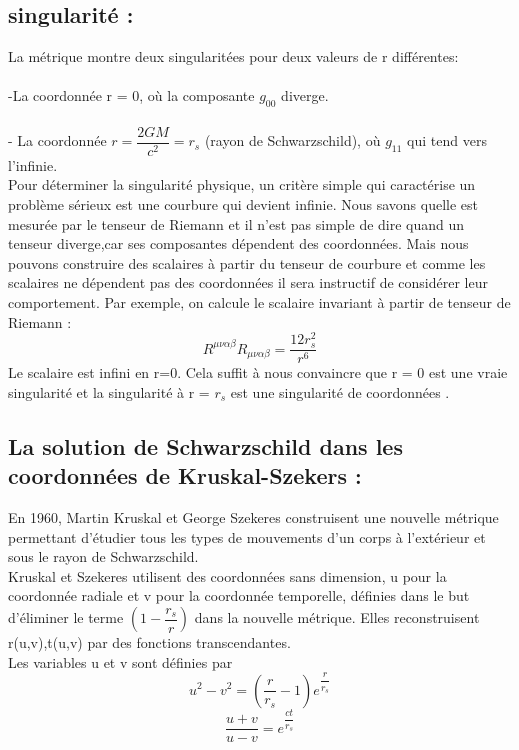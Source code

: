 \documentclass[12pt,  a4paper, openright]{report} %
\begin{document}
\subsection*{ singularité : }
La métrique montre deux singularitées pour deux valeurs de r différentes:\\
\\
-La coordonnée r = 0, où la composante $g_{00}$ diverge.\\
\\
- La coordonnée $ r = \dfrac{2GM}{c^{2}} = r_{s}$ (rayon de Schwarzschild), où $g_{11}$  qui tend vers l’infinie.\\
Pour déterminer la singularité physique, un critère simple qui caractérise un problème sérieux est une courbure qui devient infinie. Nous savons quelle est mesurée par le tenseur de Riemann et il n’est pas simple de dire quand un tenseur diverge,car ses composantes dépendent des coordonnées. Mais nous pouvons construire des scalaires à partir du tenseur de courbure et comme les scalaires ne dépendent pas des coordonnées il sera instructif de considérer leur comportement. Par exemple, on calcule le scalaire invariant à partir de tenseur de Riemann :
\begin{equation}
R^{\mu\nu\alpha\beta}R_{\mu\nu\alpha\beta}=\dfrac{12r_{s}^{2}}{r^{6}}
\end{equation}
Le scalaire est infini en r=0. Cela suffit à nous convaincre que r = 0 est une vraie singularité
et la singularité à r = $r_{s}$ est une singularité de coordonnées . 
\subsection*{ La solution de Schwarzschild dans les coordonnées de Kruskal-Szekers : }
En 1960, Martin Kruskal et George Szekeres construisent une nouvelle métrique permettant d'étudier tous les types de mouvements d'un corps à l'extérieur et sous le rayon de Schwarzschild.\\
Kruskal et Szekeres utilisent des coordonnées sans dimension,  u pour la coordonnée radiale et  v pour la coordonnée temporelle, définies dans le but d'éliminer le terme $(1-\dfrac{r_{s}}{r})$ dans la nouvelle métrique. Elles reconstruisent  r(u,v),t(u,v) par des fonctions transcendantes.\\
Les variables  u et v sont définies par \cite{9}
\begin{equation}
u^{2}-v^{2}=(\dfrac{r}{r_{s}}-1)e^{\dfrac{r}{r_{s}}}
\end{equation}
\begin{equation}
\dfrac{u+v}{u-v}=e^{\dfrac{ct}{r_{s}}}
\end{equation}
\end{document}
